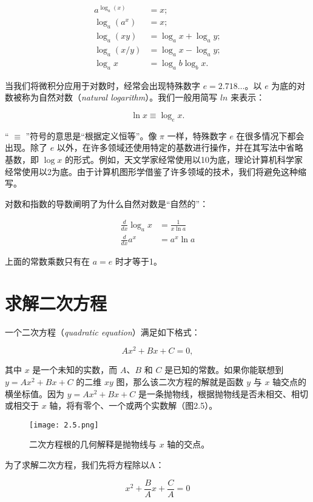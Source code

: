\documentclass[lang=cn,12pt]{elegantbook}
\begin{document}
$$
\begin{aligned}
a^{\log_a(x)} &= x; \\
\log_a(a^x) &= x; \\
\log_a(xy) &= \log_ax+\log_ay; \\
\log_a(x/y) &= \log_ax-\log_ay; \\
\log_ax &= \log_ab\log_bx.
\end{aligned}
$$

当我们将微积分应用于对数时，经常会出现特殊数字 $e=2.718\ldots $。以 $e$ 为底的对数被称为自然对数（\textit{natural logarithm}）。我们一般用简写 $ln$ 来表示：

$$\ln x \equiv \log_ex.$$

“ $\equiv$ ”符号的意思是“根据定义恒等”。像 $\pi$ 一样，特殊数字 $e$ 在很多情况下都会出现。除了 $e$ 以外，在许多领域还使用特定的基数进行操作，并在其写法中省略基数，即 $\log x$ 的形式。例如，天文学家经常使用以10为底，理论计算机科学家经常使用以2为底。由于计算机图形学借鉴了许多领域的技术，我们将避免这种缩写。

对数和指数的导数阐明了为什么自然对数是“自然的”：

$$
\begin{aligned}
\frac{d}{d x} \log _{a} x &=\frac{1}{x \ln a} \\
\frac{d}{d x} a^{x} &=a^{x} \ln a
\end{aligned}
$$

上面的常数乘数只有在 $a = e$ 时才等于1。

\section{求解二次方程}

一个二次方程（\textit{quadratic equation}）满足如下格式：

$$ Ax^2+Bx+C=0, $$

其中 $x$ 是一个未知的实数，而 $A$、$B$ 和 $C$ 是已知的常数。如果你能联想到 $y=Ax^2+Bx+C$ 的二维 $xy$ 图，那么该二次方程的解就是函数 $y$ 与 $x$ 轴交点的横坐标值。因为 $y=Ax^2+Bx+C$ 是一条抛物线，根据抛物线是否未相交、相切或相交于 $x$ 轴，将有零个、一个或两个实数解（图2.5）。

\begin{figure}[htbp]
\centering
\texttt{[image: 2.5.png]}
\caption{二次方程根的几何解释是抛物线与 $x$ 轴的交点。}
\end{figure}

为了求解二次方程，我们先将方程除以A：

$$x^2+\frac{B}{A} x+\frac{C}{A}=0$$
\end{document}
